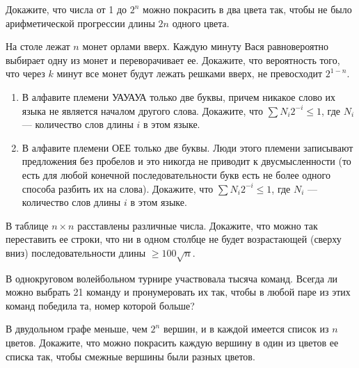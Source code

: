 \begin{problem}
Докажите, что числа от 1 до $2^n$ можно покрасить в два цвета так, чтобы не было арифметической прогрессии длины $2n$ одного цвета.
\end{problem}

\begin{problem}
На столе лежат $n$ монет орлами вверх. Каждую минуту Вася равновероятно выбирает одну из монет  и переворачивает ее. Докажите, что вероятность того, что через $k$ минут все монет
будут лежать решками вверх, не превосходит $2^{1-n}$.
\end{problem}


\begin{problem}
\begin{enumerate}
\item В алфавите племени УАУАУА только две буквы,
причем никакое слово их языка не является началом другого слова.
Докажите, что $\sum N_i2^{-i}\leq 1$,
где $N_i$ --- количество слов длины $i$ в этом языке.
\item В алфавите племени ОЕЕ только две буквы. Люди
этого племени записывают
предложения без пробелов и это никогда
не приводит к двусмысленности (то есть для
любой конечной последовательности букв есть не более одного способа
разбить их на слова). Докажите, что
$\sum N_i2^{-i}\leq 1$,
где $N_i$ --- количество слов длины $i$ в этом языке.
\end{enumerate}
\end{problem}

\begin{problem}
В таблице $n\times n$ расставлены различные числа.
Докажите, что можно так переставить ее строки, что
ни в одном столбце не будет возрастающей (сверху вниз) последовательности длины $\geq 100 \sqrt{n}$.
\end{problem}

\begin{problem}
В однокруговом волейбольном турнире участвовала тысяча команд.
Всегда ли можно выбрать 21 команду и пронумеровать их так,
чтобы в любой паре из этих команд победила та, номер которой больше?
\end{problem}

\begin{problem}
В двудольном графе меньше, чем $2^n$ вершин, и в каждой
имеется список из $n$ цветов. Докажите, что можно
покрасить каждую вершину в один из цветов ее списка
так, чтобы смежные вершины были разных цветов.
\end{problem}

